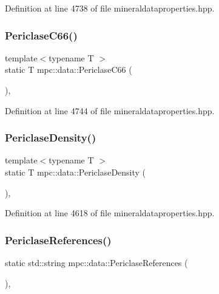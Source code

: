 Definition at line 4738 of file mineraldataproperties.\+hpp.

\mbox{\label{namespacempc_1_1data_a9e9baf8088a8c5bc14ffa35a35df4db3}} 
\subsubsection{\texorpdfstring{Periclase\+C66()}{PericlaseC66()}}
{\footnotesize\ttfamily template$<$typename T $>$ \\
static T mpc\+::data\+::\+Periclase\+C66 (\begin{DoxyParamCaption}{ }\end{DoxyParamCaption})\hspace{0.3cm}{\ttfamily [inline]}, {\ttfamily [static]}}



Definition at line 4744 of file mineraldataproperties.\+hpp.

\mbox{\label{namespacempc_1_1data_af5b92f262d158182e3800498e73c2319}} 
\subsubsection{\texorpdfstring{Periclase\+Density()}{PericlaseDensity()}}
{\footnotesize\ttfamily template$<$typename T $>$ \\
static T mpc\+::data\+::\+Periclase\+Density (\begin{DoxyParamCaption}{ }\end{DoxyParamCaption})\hspace{0.3cm}{\ttfamily [inline]}, {\ttfamily [static]}}



Definition at line 4618 of file mineraldataproperties.\+hpp.

\mbox{\label{namespacempc_1_1data_a6f4cfa59bcde68d97eda95e810e984ca}} 
\subsubsection{\texorpdfstring{Periclase\+References()}{PericlaseReferences()}}
{\footnotesize\ttfamily static std\+::string mpc\+::data\+::\+Periclase\+References (\begin{DoxyParamCaption}{ }\end{DoxyParamCaption})\hspace{0.3cm}{\ttfamily [inline]}, {\ttfamily [static]}}



